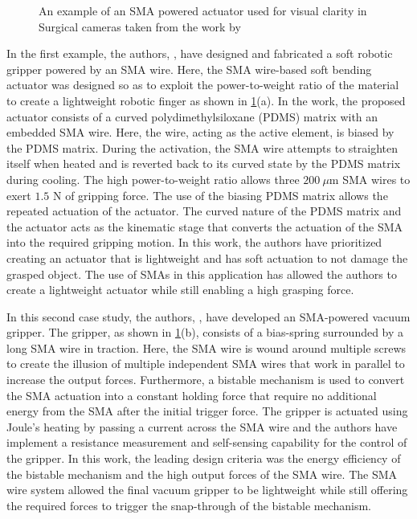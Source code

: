 \begin{figure}[h]
    \centering
    
    \caption{An example of an SMA powered actuator used for visual clarity in Surgical cameras taken from the work by \todocite}
    \label{fig:industrial-examples}
\end{figure}

In the first example, the authors, \todocite, have designed and fabricated a soft robotic gripper powered by an SMA wire. Here, the SMA wire-based soft bending actuator was designed so as to exploit the power-to-weight ratio of the material to create a lightweight robotic finger as shown in \cref{fig:industrial-examples}(a). In the work, the proposed actuator consists of a curved polydimethylsiloxane (PDMS) matrix with an embedded SMA wire. Here, the wire, acting as the active element, is biased by the PDMS matrix. During the activation, the SMA wire attempts to straighten itself when heated and is reverted back to its curved state by the PDMS matrix during cooling. The high power-to-weight ratio allows three $200~\mu$m SMA wires to exert $1.5$ N of gripping force. The use of the biasing PDMS matrix allows the repeated actuation of the actuator. The curved nature of the PDMS matrix and the actuator acts as the kinematic stage that converts the actuation of the SMA into the required gripping motion. In this work, the authors have prioritized creating an actuator that is lightweight and has soft actuation to not damage the grasped object. The use of SMAs in this application has allowed the authors to create a lightweight actuator while still enabling a high grasping force.

In this second case study, the authors, \todocite, have developed an SMA-powered vacuum gripper. The gripper, as shown in \cref{fig:industrial-examples}(b), consists of a bias-spring surrounded by a long SMA wire in traction. Here, the SMA wire is wound around multiple screws to create the illusion of multiple independent SMA wires that work in parallel to increase the output forces. Furthermore, a bistable mechanism is used to convert the SMA actuation into a constant holding force that require no additional energy from the SMA after the initial trigger force. The gripper is actuated using Joule's heating by passing a current across the SMA wire and the authors have implement a resistance measurement and self-sensing capability for the control of the gripper. In this work, the leading design criteria was the energy efficiency of the bistable mechanism and the high output forces of the SMA wire. The SMA wire system allowed the final vacuum gripper to be lightweight while still offering the required forces to trigger the snap-through of the bistable mechanism.

